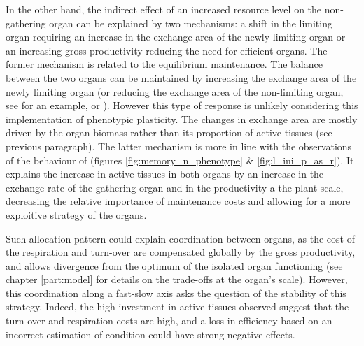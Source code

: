 In the other hand, the indirect effect of an increased resource level on the non-gathering organ can be explained by two mechanisms: a shift in the limiting organ requiring an increase in the exchange area of the newly limiting organ or an increasing gross productivity reducing the need for efficient organs. The former mechanism is related to the equilibrium maintenance. The balance between the two organs can be maintained by increasing the exchange area of the newly limiting organ (or reducing the exchange area of the non-limiting organ, see \cite{liu_biomass_2004} for an example, or \cite{grassein_plant_2010}). However this type of response is unlikely considering this implementation of phenotypic plasticity. The changes in exchange area are mostly driven by the organ biomass rather than its proportion of active tissues (see previous paragraph). The latter mechanism is more in line with the observations of the behaviour of \model (figures \ref{fig:memory_n_phenotype} \& \ref{fig:l_ini_p_as_r}). It explains the increase in active tissues in both organs by an increase in the exchange rate of the gathering organ and in the productivity a the plant scale, decreasing the relative importance of maintenance costs and allowing for a more exploitive strategy of the organs. 

Such allocation pattern could explain coordination between organs, as the cost of the respiration and turn-over are compensated globally by the gross productivity, and allows divergence from the optimum of the isolated organ functioning (see chapter \ref{part:model} for details on the trade-offs at the organ's scale). However, this coordination along a fast-slow axis asks the question of the stability of this strategy. Indeed, the high investment in active tissues observed suggest that the turn-over and respiration costs are high, and a loss in efficiency based on an incorrect estimation of condition could have strong negative effects. 







